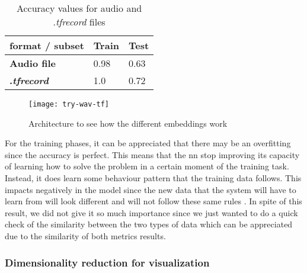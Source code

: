 	\begin{table}[h]
		\begin{center}
			\centering
			\begin{tabular}{|| m{7em} | m{7em} | m{7em} ||}
				\hline
				format / subset & \textbf{Train} & \textbf{Test} \\
				\hline\hline
				\textbf{Audio file} & 0.98 & 0.63 \\
				\hline
				\textbf{.\textit{tfrecord}} & 1.0 & 0.72 \\
				\hline
			\end{tabular}
		\end{center}
		\caption{Accuracy values for audio and .\textit{tfrecord} files}
		\label{table:5}
	\end{table}
	
	\begin{wrapfigure}[15]{R}{0.4\textwidth}
		\centering
		\captionsetup{justification=centering}
		\texttt{[image: try-wav-tf]}
		\caption{Architecture to see how the different embeddings work}
		\label{fig:mesh5}
	\end{wrapfigure}
	
	For the training phases, it can be appreciated that there may be an overfitting since the accuracy is perfect. This means that the \acrshort{nn} stop improving its capacity of learning how to solve the problem in a certain moment of the training task. Instead, it does learn some behaviour pattern that the training data follows. This impacts negatively in the model since the new data that the system will have to learn from will look different and will not follow these same rules \cite{Jabbar2015}. In spite of this result, we did not give it so much importance since we just wanted to do a quick check of the similarity between the two types of data which can be appreciated due to the similarity of both metrics results.
	
\subsubsection{Dimensionality reduction for visualization}
\label{subsection:dimensionality-reduction-for-visualization}

